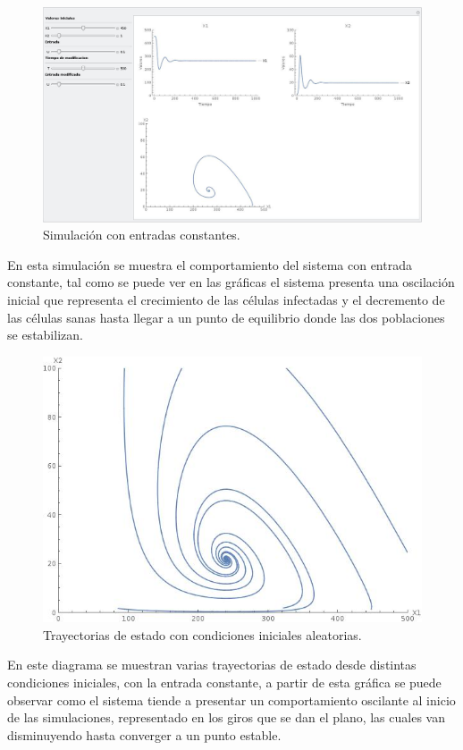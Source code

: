 \documentclass{article}
\begin{document}
\begin{figure}[H]
    \includegraphics[width=\textwidth]{Images/Vih-u-constante}
    \caption{Simulación con entradas constantes.}
\end{figure}

En esta simulación se muestra el comportamiento del sistema con entrada constante,
tal como se puede ver en las gráficas el sistema presenta una oscilación inicial
que representa el crecimiento de las células infectadas y el decremento de las
células sanas hasta llegar a un punto de equilibrio donde las dos poblaciones se
estabilizan.

\begin{figure}[H]
    \centering
    \includegraphics[scale=0.4]{Images/Vih-random}
    \caption{Trayectorias de estado con condiciones iniciales aleatorias.}
\end{figure}

En este diagrama se muestran varias trayectorias de estado desde distintas
condiciones iniciales, con la entrada constante, a partir de esta gráfica se
puede observar como el sistema tiende a presentar un comportamiento oscilante al
inicio de las simulaciones, representado en los giros que se dan el plano,
las cuales van disminuyendo hasta converger a un punto estable.
\end{document}

